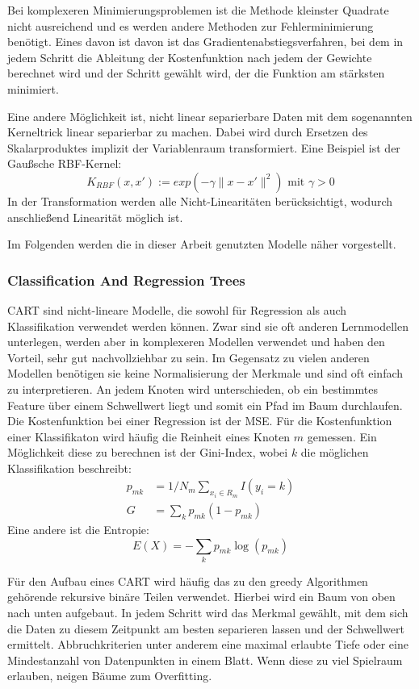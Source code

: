 		Bei komplexeren Minimierungsproblemen ist die Methode kleinster Quadrate nicht ausreichend und es werden andere Methoden zur Fehlerminimierung benötigt. Eines davon ist davon ist das Gradientenabstiegsverfahren, bei dem in jedem Schritt die Ableitung der Kostenfunktion nach jedem der Gewichte berechnet wird und der Schritt gewählt wird, der die Funktion am stärksten minimiert.
		
		Eine andere Möglichkeit ist, nicht linear separierbare Daten mit dem sogenannten Kerneltrick linear separierbar zu machen. Dabei wird durch Ersetzen des Skalarproduktes implizit der Variablenraum transformiert. Eine Beispiel ist der Gaußsche RBF-Kernel:
		\[
			K_{RBF} (x, x\prime) := exp(-\gamma \|x - x\prime\|^2) \text{ mit } \gamma > 0
		\]
		In der Transformation werden alle Nicht-Linearitäten berücksichtigt, wodurch anschließend Linearität möglich ist.
		
		Im Folgenden werden die in dieser Arbeit genutzten Modelle näher vorgestellt.

	
		\subsubsection{Classification And Regression Trees}
		
		\ac{CART} sind nicht-lineare Modelle, die sowohl für Regression als auch Klassifikation verwendet werden können. Zwar sind sie oft anderen Lernmodellen unterlegen, werden aber in komplexeren Modellen verwendet und haben den Vorteil, sehr gut nachvollziehbar zu sein. Im Gegensatz zu vielen anderen Modellen benötigen sie keine Normalisierung der Merkmale und sind oft einfach zu interpretieren. An jedem Knoten wird unterschieden, ob ein bestimmtes Feature über einem Schwellwert liegt und somit ein Pfad im Baum durchlaufen. Die Kostenfunktion bei einer Regression ist der \ac{MSE}. Für die Kostenfunktion einer Klassifikaton wird häufig die \glqq{}Reinheit\grqq{} eines Knoten $m$ gemessen. Ein Möglichkeit diese zu berechnen ist der Gini-Index, wobei $k$ die möglichen Klassifikation beschreibt:
		\begin{align*}
			p_{mk} &= 1/ N_m \sum_{x_i \in R_m} I(y_i = k)\\
			G &= \sum_k p_{mk} (1 - p_{mk})
		\end{align*}
		Eine andere ist die Entropie:
		\[
			E(X) = - \sum_k p_{mk} \log(p_{mk}) 
		\]
		
		Für den Aufbau eines \ac{CART} wird häufig das zu den greedy Algorithmen gehörende rekursive binäre Teilen verwendet. Hierbei wird ein Baum von oben nach unten aufgebaut. In jedem Schritt wird das Merkmal gewählt, mit dem sich die Daten zu diesem Zeitpunkt am besten separieren lassen und der Schwellwert ermittelt. Abbruchkriterien unter anderem eine maximal erlaubte Tiefe oder eine Mindestanzahl von Datenpunkten in einem Blatt. Wenn diese zu viel Spielraum erlauben, neigen Bäume zum Overfitting.
		
